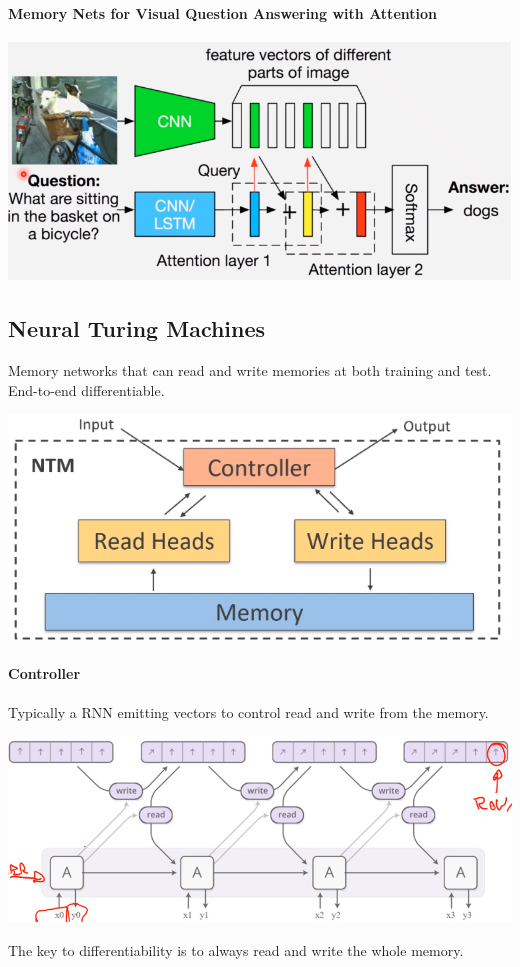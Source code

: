 \documentclass[10pt]{report}
\begin{document}
\paragraph{Memory Nets for Visual Question Answering with Attention}\begin{center}
	\includegraphics[scale=0.5]{130.png}
\end{center}
\subsection{Neural Turing Machines}
Memory networks that can read and write memories at both training and test. End-to-end differentiable.
\begin{center}
	\includegraphics[scale=0.5]{131.png}
\end{center}
\paragraph{Controller} Typically a RNN emitting vectors to control read and write from the memory.\begin{center}
	\includegraphics[scale=0.5]{132.png}
\end{center}
The key to differentiability is to always read and write the whole memory.
\end{document}
